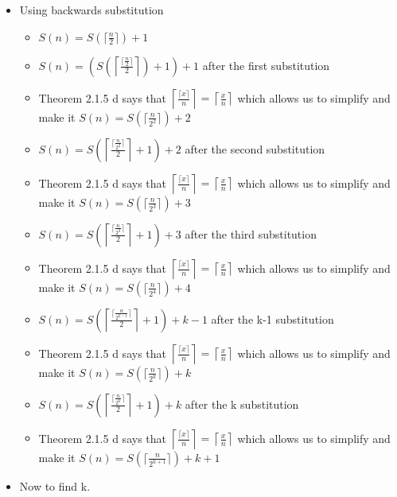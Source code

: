 \begin{enumerate}
\begin{enumerate}
    \begin{itemize}
    \item Using backwards substitution
      \begin{itemize}
      \item $S(n)=S(\lceil \frac{n}{2} \rceil)+1$
      \item $S(n)=\left(S\left(\left\lceil \frac{\lceil \frac{n}{2} \rceil}{2} \right\rceil\right)+1\right)+1$ after the first substitution
      \item Theorem 2.1.5 d says that $\left\lceil\frac{\lceil x \rceil}{n}\right\rceil = \left\lceil\frac{x}{n}\right\rceil$ which allows us to simplify and make it $S(n)=S\left(\lceil \frac{n}{2^{2}} \rceil\right)+2$
      \item $S(n)=S\left(\left\lceil \frac{\lceil \frac{n}{2^{2}} \rceil}{2} \right\rceil +1 \right)+2$ after the second substitution
      \item Theorem 2.1.5 d says that $\left\lceil\frac{\lceil x \rceil}{n}\right\rceil = \left\lceil\frac{x}{n}\right\rceil$ which allows us to simplify and make it $S(n)=S\left(\lceil \frac{n}{2^{3}} \rceil\right)+3$
      \item $S(n)=S\left(\left\lceil \frac{\lceil \frac{n}{2^{3}} \rceil}{2} \right\rceil +1 \right)+3$ after the third substitution
      \item Theorem 2.1.5 d says that $\left\lceil\frac{\lceil x \rceil}{n}\right\rceil = \left\lceil\frac{x}{n}\right\rceil$ which allows us to simplify and make it $S(n)=S\left(\lceil \frac{n}{2^{4}} \rceil\right)+4$
      \item $S(n)=S\left(\left\lceil \frac{\lceil \frac{n}{2^{k-1}} \rceil}{2} \right\rceil +1 \right)+k-1$ after the k-1 substitution
      \item Theorem 2.1.5 d says that $\left\lceil\frac{\lceil x \rceil}{n}\right\rceil = \left\lceil\frac{x}{n}\right\rceil$ which allows us to simplify and make it $S(n)=S\left(\lceil \frac{n}{2^{k}} \rceil\right)+k$
      \item $S(n)=S\left(\left\lceil \frac{\lceil \frac{n}{2^{k}} \rceil}{2} \right\rceil +1 \right)+k$ after the k substitution
      \item Theorem 2.1.5 d says that $\left\lceil\frac{\lceil x \rceil}{n}\right\rceil = \left\lceil\frac{x}{n}\right\rceil$ which allows us to simplify and make it $S(n)=S\left(\lceil \frac{n}{2^{k+1}} \rceil\right)+k+1$
      \end{itemize}
    \item Now to find k. 
      \begin{itemize}

\end{itemize}
\end{itemize}
\end{enumerate}
\end{enumerate}
